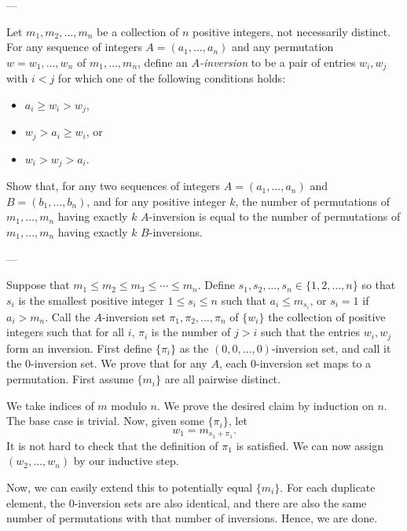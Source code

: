 
---

Let $m_1,m_2,\ldots,m_n$ be a collection of $n$ positive integers, not necessarily distinct. For any sequence of integers $A=(a_1,\ldots,a_n)$ and any permutation $w=w_1,\ldots,w_n$ of $m_1,\ldots,m_n$, define an \textit{$A$-inversion} to be a pair of entries $w_i,w_j$ with $i<j$ for which one of the following conditions holds:
\begin{itemize}[itemsep=0em]
    \item $a_i\ge w_i>w_j$,
    \item $w_j>a_i\ge w_i$, or
    \item $w_i>w_j>a_i$.
\end{itemize}
Show that, for any two sequences of integers $A=(a_1,\ldots,a_n)$ and $B=(b_1,\ldots,b_n)$, and for any positive integer $k$, the number of permutations of $m_1,\ldots,m_n$ having exactly $k$ $A$-inversion is equal to the number of permutations of $m_1,\ldots,m_n$ having exactly $k$ $B$-inversions.

---

Suppose that $m_1\le m_2\le m_3\le\cdots\le m_n$. Define $s_1,s_2,\ldots,s_n\in\{1,2,\ldots,n\}$ so that $s_i$ is the smallest positive integer $1\le s_i\le n$ such that $a_i\le m_{s_i}$, or $s_i=1$ if $a_i>m_n$. Call the $A$-inversion set $\pi_1,\pi_2,\ldots,\pi_n$ of $\{w_i\}$ the collection of positive integers such that for all $i$, $\pi_i$ is the number of $j>i$ such that the entries $w_i,w_j$ form an inversion. First define $\{\pi_i\}$ as the $(0,0,\ldots,0)$-inversion set, and call it the $0$-inversion set. We prove that for any $A$, each $0$-inversion set maps to a permutation. First assume $\{m_i\}$ are all pairwise distinct.

We take indices of $m$ modulo $n$. We prove the desired claim by induction on $n$. The base case is trivial. Now, given some $\{\pi_i\}$, let \[w_1=m_{s_1+\pi_1}.\]
It is not hard to check that the definition of $\pi_1$ is satisfied. We can now assign $(w_2,\ldots,w_n)$ by our inductive step.

Now, we can easily extend this to potentially equal $\{m_i\}$. For each duplicate element, the $0$-inversion sets are also identical, and there are  also the same number of permutations with that number of inversions. Hence, we are done. 
